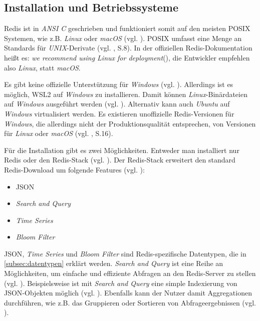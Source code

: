 
\subsection{Installation und Betriebssysteme}
\label{subsection:installation}

\acs{Redis} ist in \textit{ANSI C} geschrieben und funktioniert somit auf den meisten \acs{POSIX} Systemen, wie z.B. \textit{Linux} oder \textit{macOS} (vgl. \cite{Redis-Docs-Intro}). \ac{POSIX} umfasst eine Menge an Standards für \textit{UNIX}-Derivate (vgl. \cite{15}, S.8). In der offiziellen \ac{Redis}-Dokumentation heißt es: \glqq \textit{we recommend using Linux for deployment}\grqq (\cite{Redis-Docs-Intro}), die Entwickler empfehlen also \textit{Linux}, statt \textit{macOS}.

Es gibt keine offizielle Unterstützung für \textit{Windows} (vgl. \cite{Redis-Docs-Intro}). Allerdings ist es möglich, \ac{WSL2} auf \textit{Windows} zu installieren. Damit können \textit{Linux}-Binärdateien auf \textit{Windows} ausgeführt werden (vgl. \cite{Redis-Docs-Install-W}). Alternativ kann auch \textit{Ubuntu} auf \textit{Windows} virtualisiert werden. Es existieren unoffizielle \ac{Redis}-Versionen für \textit{Windows}, die allerdings nicht der Produktionsqualität entsprechen, von Versionen für \textit{Linux} oder \textit{macOS} (vgl. \cite{4}, S.16). 

Für die Installation gibt es zwei Möglichkeiten. Entweder man installiert nur \ac{Redis} oder den \ac{Redis}-Stack (vgl. \cite{Redis-Docs-Install-R-or-RS}). Der \ac{Redis}-Stack erweitert den standard \ac{Redis}-Download um folgende Features (vgl. \cite{Redis-Docs-Redis-Stack}):

\begin{itemize}
	\item \ac{JSON}
	\item \textit{Search and Query}
	\item \textit{Time Series}
	\item \textit{Bloom Filter}
\end{itemize}

\ac{JSON}, \textit{Time Series} und \textit{Bloom Filter} sind \ac{Redis}-spezifische Datentypen, die in \autoref{subsec:datentypen} erklärt werden. \textit{Search and Query} ist eine Reihe an Möglichkeiten, um einfache und effiziente Abfragen an den \ac{Redis}-Server zu stellen (vgl. \cite{Redis-Docs-Search-Query}). Beispielsweise ist mit \textit{Search and Query} eine simple Indexierung von \ac{JSON}-Objekten möglich (vgl. \cite{Redis-Docs-Search-Query}). Ebenfalls kann der Nutzer damit Aggregationen durchführen, wie z.B. das Gruppieren oder Sortieren von Abfrageergebnissen (vgl. \cite{Redis-Docs-Aggregation}).  

